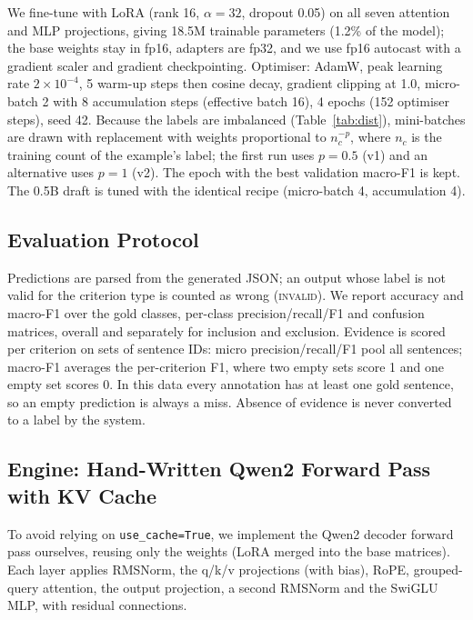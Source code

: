 \documentclass[conference]{IEEEtran}
\begin{document}
We fine-tune with LoRA (rank 16, $\alpha{=}32$, dropout 0.05) on all seven attention and MLP projections, giving 18.5M trainable parameters (1.2\% of the model); the base weights stay in fp16, adapters are fp32, and we use fp16 autocast with a gradient scaler and gradient checkpointing. Optimiser: AdamW, peak learning rate $2\times10^{-4}$, 5 warm-up steps then cosine decay, gradient clipping at 1.0, micro-batch 2 with 8 accumulation steps (effective batch 16), 4 epochs (152 optimiser steps), seed 42. Because the labels are imbalanced (Table~\ref{tab:dist}), mini-batches are drawn with replacement with weights proportional to $n_c^{-p}$, where $n_c$ is the training count of the example's label; the first run uses $p{=}0.5$ (v1) and an alternative uses $p{=}1$ (v2). The epoch with the best validation macro-F1 is kept. The 0.5B draft is tuned with the identical recipe (micro-batch 4, accumulation 4).

\begin{table}[t]
\caption{Annotations per split (patients in parentheses) and label distribution (criterion type: label).}
\label{tab:dist}
\centering\scriptsize
\resizebox{\columnwidth}{!}{}
\end{table}

\subsection{Evaluation Protocol}
Predictions are parsed from the generated JSON; an output whose label is not valid for the criterion type is counted as wrong (\textsc{invalid}). We report accuracy and macro-F1 over the gold classes, per-class precision/recall/F1 and confusion matrices, overall and separately for inclusion and exclusion. Evidence is scored per criterion on sets of sentence IDs: micro precision/recall/F1 pool all sentences; macro-F1 averages the per-criterion F1, where two empty sets score 1 and one empty set scores 0. In this data every annotation has at least one gold sentence, so an empty prediction is always a miss. Absence of evidence is never converted to a label by the system.

\subsection{Engine: Hand-Written Qwen2 Forward Pass with KV Cache}
To avoid relying on \texttt{use\_cache=True}, we implement the Qwen2 decoder forward pass ourselves, reusing only the weights (LoRA merged into the base matrices). Each layer applies RMSNorm, the q/k/v projections (with bias), RoPE, grouped-query attention, the output projection, a second RMSNorm and the SwiGLU MLP, with residual connections.
\end{document}
